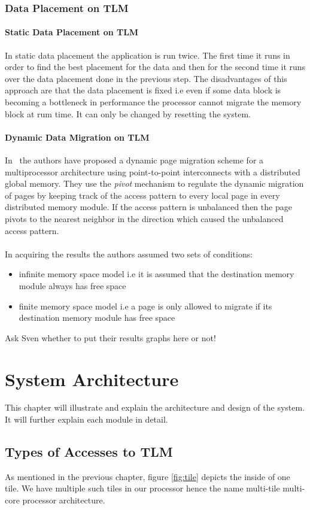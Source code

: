 \documentclass{listhesis}
\begin{document}
\subsection{Data Placement on TLM}
\subsubsection{Static Data Placement on TLM}
In static data placement the application is run twice. The first time it runs in order to find the best placement for the data and then for the second time it runs over the data placement done in the previous step. The disadvantages of this approach are that the data placement is fixed i.e even if some data block is becoming a bottleneck in performance the processor cannot migrate the memory block at rum time. It can only be changed by resetting the system. 
\subsubsection{Dynamic Data Migration on TLM}
In~\cite{dynamicPageMigration} the authors have proposed a dynamic page migration scheme for a multiprocessor architecture using point-to-point interconnects with a distributed global memory. They use the \textit{pivot} mechanism to regulate the dynamic migration of pages by keeping track of the access pattern to every local page in every distributed memory module. If the access pattern is unbalanced then the page pivots to the nearest neighbor in the direction which caused the unbalanced access pattern.\\
\\
In acquiring the results the authors assumed two sets of conditions:
\begin{itemize}
	\item infinite memory space model i.e it is assumed that the destination memory module always has free space
	\item finite memory space model i.e a page is only allowed to migrate if its destination memory module has free space
\end{itemize}
Ask Sven whether to put their results graphs here or not!
\chapter{System Architecture}
This chapter will illustrate and explain the architecture and design of the system. It will further explain each module in detail.
\section{Types of Accesses to TLM}
As mentioned in the previous chapter, figure \ref{fig:tile} depicts the inside of one tile. We have multiple such tiles in our processor hence the name multi-tile multi-core processor architecture.
\end{document}
